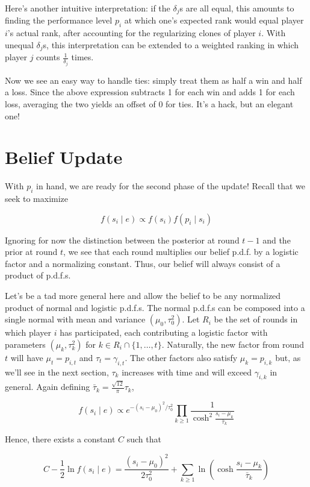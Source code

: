 \documentclass{article}
\begin{document}
Here's another intuitive interpretation: if the $\delta_j$s are all equal, this amounts to finding the performance level $p_i$ at which one's expected rank would equal player $i$'s actual rank, after accounting for the regularizing clones of player $i$. With unequal $\delta_j$s, this interpretation can be extended to a weighted ranking in which player $j$ counts $\frac{1}{\delta_j}$ times.

Now we see an easy way to handle ties: simply treat them as half a win and half a loss. Since the above expression subtracts 1 for each win and adds 1 for each loss, averaging the two yields an offset of 0 for ties. It's a hack, but an elegant one!

\section{Belief Update}

With $p_i$ in hand, we are ready for the second phase of the update! Recall that we seek to maximize

\[f(s_i\mid e) \propto f(s_i)f(p_i\mid s_i)\]

Ignoring for now the distinction between the posterior at round $t-1$ and the prior at round $t$, we see that each round multiplies our belief p.d.f. by a logistic factor and a normalizing constant. Thus, our belief will always consist of a product of p.d.f.s.

Let's be a tad more general here and allow the belief to be any normalized product of normal and logistic p.d.f.s. The normal p.d.f.s can be composed into a single normal with mean and variance $(\mu_0, \tau_0^2)$. Let $R_i$ be the set of rounds in which player $i$ has participated, each contributing a logistic factor with parameters $(\mu_k, \tau_k^2)$ for $k\in R_i\cap \{1,\ldots,t\}$. Naturally, the new factor from round $t$ will have $\mu_t = p_{i,t}$ and $\tau_t = \gamma_{i,t}$. The other factors also satisfy $\mu_k = p_{i,k}$ but, as we'll see in the next section, $\tau_k$ increases with time and will exceed $\gamma_{i,k}$ in general. Again defining $\bar\tau_k = \frac{\sqrt{12}}{\pi} \tau_k$,

\[
f(s_i\mid e)
\propto e^{-(s_i-\mu_0)^2/\tau_0^2} \prod_{k\ge 1} \frac { 1 } { \cosh^2\frac{s_i-\mu_k} {\bar\tau_k} }
\]

Hence, there exists a constant $C$ such that

\[C - \frac 1 2 \ln f(s_i \mid e) = \frac{(s_i-\mu_0)^2}{2\tau_0^2} + \sum_{k\ge 1} \ln\left( \cosh\frac{s_i-\mu_k}{\bar\tau_k} \right)\]
\end{document}
